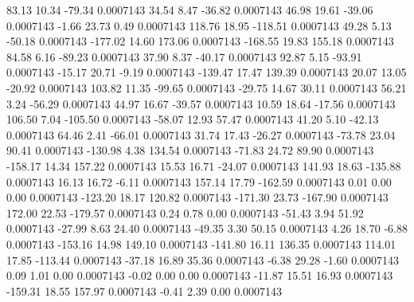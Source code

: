        83.13       10.34      -79.34     0.0007143
       34.54        8.47      -36.82     0.0007143
       46.98       19.61      -39.06     0.0007143
       -1.66       23.73        0.49     0.0007143
      118.76       18.95     -118.51     0.0007143
       49.28        5.13      -50.18     0.0007143
     -177.02       14.60      173.06     0.0007143
     -168.55       19.83      155.18     0.0007143
       84.58        6.16      -89.23     0.0007143
       37.90        8.37      -40.17     0.0007143
       92.87        5.15      -93.91     0.0007143
      -15.17       20.71       -9.19     0.0007143
     -139.47       17.47      139.39     0.0007143
       20.07       13.05      -20.92     0.0007143
      103.82       11.35      -99.65     0.0007143
      -29.75       14.67       30.11     0.0007143
       56.21        3.24      -56.29     0.0007143
       44.97       16.67      -39.57     0.0007143
       10.59       18.64      -17.56     0.0007143
      106.50        7.04     -105.50     0.0007143
      -58.07       12.93       57.47     0.0007143
       41.20        5.10      -42.13     0.0007143
       64.46        2.41      -66.01     0.0007143
       31.74       17.43      -26.27     0.0007143
      -73.78       23.04       90.41     0.0007143
     -130.98        4.38      134.54     0.0007143
      -71.83       24.72       89.90     0.0007143
     -158.17       14.34      157.22     0.0007143
       15.53       16.71      -24.07     0.0007143
      141.93       18.63     -135.88     0.0007143
       16.13       16.72       -6.11     0.0007143
      157.14       17.79     -162.59     0.0007143
        0.01        0.00        0.00     0.0007143
     -123.20       18.17      120.82     0.0007143
     -171.30       23.73     -167.90     0.0007143
      172.00       22.53     -179.57     0.0007143
        0.24        0.78        0.00     0.0007143
      -51.43        3.94       51.92     0.0007143
      -27.99        8.63       24.40     0.0007143
      -49.35        3.30       50.15     0.0007143
        4.26       18.70       -6.88     0.0007143
     -153.16       14.98      149.10     0.0007143
     -141.80       16.11      136.35     0.0007143
      114.01       17.85     -113.44     0.0007143
      -37.18       16.89       35.36     0.0007143
       -6.38       29.28       -1.60     0.0007143
        0.09        1.01        0.00     0.0007143
       -0.02        0.00        0.00     0.0007143
      -11.87       15.51       16.93     0.0007143
     -159.31       18.55      157.97     0.0007143
       -0.41        2.39        0.00     0.0007143

